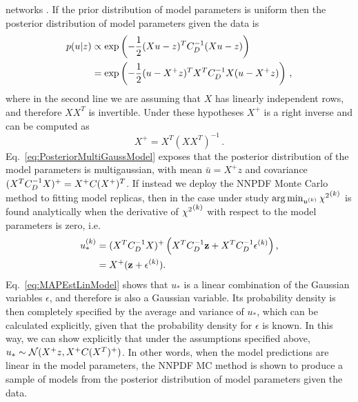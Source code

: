 networks \cite{ADVANI2020428}. If the prior distribution of model parameters is
uniform then the posterior distribution of model parameters given the data is
\begin{equation}
    \label{eq:PosteriorMultiGaussModel}
    \begin{split}
        p(u | z) &\propto
        \exp \left( -\frac{1}{2} (Xu - z)^T C^{-1}_{D} (Xu - z)\right) \\
        &= \exp \left( -\frac{1}{2} (u - X^+z)^T X^TC^{-1}_{D}X (u - X^+z)\right)\, ,
    \end{split}
\end{equation}
where in the second line we are assuming that $X$ has linearly independent rows,
and therefore $X X^T$ is invertible. Under these hypotheses $X^+$ is a
right inverse and can be computed as
\begin{equation}
    \label{eq:RightInverse}
    X^+ = X^T \left(X X^T\right)^{-1}\, .
\end{equation}
Eq.~\ref{eq:PosteriorMultiGaussModel} exposes that the posterior distribution of
the model parameters is multigaussian, with mean $\bar{u} = X^+z$ and covariance
$(X^TC^{-1}_{D}X)^+ = X^+ C (X^+)^T$. If instead we deploy the NNPDF Monte
Carlo method to fitting model replicas, then in the case under study
$\arg\min_{u^{(k)}} {\chi^2}^{(k)}$ is found analytically when the derivative of
${\chi^2}^{(k)}$ with respect to the model parameters is zero, i.e.
\begin{equation}
    \begin{split}
        \label{eq:MAPEstLinModel}
        u^{(k)}_* &= (X^TC^{-1}_{D}X)^{+}
        \left( X^T C^{-1}_{D} \mathbf{z} + X^T C^{-1}_{D} 
        \mathbf{\epsilon}^{(k)} \right), \\
        &= X^+ (\mathbf{z} + \mathbf{\epsilon}^{(k)}).
    \end{split}
\end{equation}
Eq.~\ref{eq:MAPEstLinModel} shows that $u_*$ is a linear combination of the
Gaussian variables $\epsilon$, and therefore is also a Gaussian variable. Its
probability density is then completely specified by the average and variance of
$u_*$, which can be calculated explicitly, given that the probability density
for $\epsilon$ is known.  In this way, we can show explicitly that under the
assumptions specified above, $u_* \sim \mathcal{N}( X^+z, X^+ C (X^T)^+)$.
In other words, when the model predictions are linear in the model parameters,
the NNPDF MC method is shown to produce a sample of models from the posterior
distribution of model parameters given the data.

